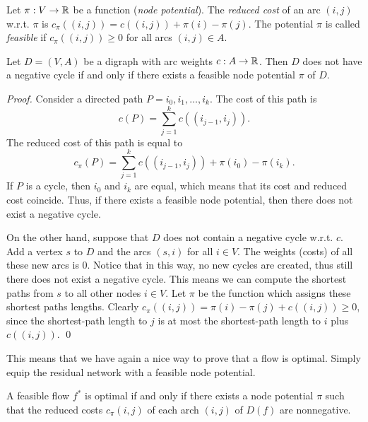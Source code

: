 Let $\pi : V  \to \mathbb{R}$ be a function (\emph{node potential}). The
\emph{reduced cost} of an arc $(i,j)$ w.r.t. $\pi$ is 
$c_\pi((i,j))=c((i,j))+\pi(i) - \pi(j)$. The potential $\pi$ is called
\emph{feasible} if $c_\pi((i,j))\geq0$ for all arcs $(i,j)\in A$. 

\begin{lemma}
  \label{lem:7}
  Let $D = (V,A)$ be a digraph with arc weights $c:A\to\mathbb{R}$. Then $D$
  does not have a negative cycle if and only if there exists a
  feasible node potential $\pi$ of $D$. 
\end{lemma}


\begin{proof}
  Consider a directed path $P = i_0,i_1,\ldots,i_k$. The cost of this
  path is 
  \begin{displaymath}
    c(P) = \sum_{j=1}^{k}c((i_{j-1},i_j)).
  \end{displaymath}
  The reduced cost of this path is equal to 
  \begin{displaymath}
    c_\pi(P) = \sum_{j=1}^{k}c((i_{j-1},i_j)) + \pi(i_0) - \pi(i_k).
  \end{displaymath}
  If $P$ is a cycle, then $i_0$ and $i_k$ are equal, which means that
  its cost and reduced cost coincide. Thus, if there exists a feasible
  node potential, then there does not exist a negative cycle. 

  
  On the other hand, suppose that $D$ does not contain a negative
  cycle w.r.t. $c$. Add a vertex $s$ to $D$ and the arcs $(s,i)$ for all 
  $i \in  V$. The weights (costs) of all these new arcs is $0$. Notice
  that in this way, no new cycles are created, thus still there does
  not exist a negative cycle. This means we can compute the shortest
  paths from $s$ to all other nodes $i \in V$. Let $\pi$ be the function
  which assigns these shortest paths lengths. Clearly $c_\pi((i,j)) =
  \pi(i) - \pi(j) + c((i,j))\geq0$, since the shortest-path length to $j$ is
  at most the shortest-path length to $i$ plus $c((i,j))$.  \qed
\end{proof}

  
This means that we have again a nice way to prove that a flow is
optimal. Simply equip  the residual network with a feasible node
potential.  



\begin{corollary}
  \label{co:1}
  A feasible flow $f^*$ is optimal if and only if there exists a node
  potential $\pi$ such that the reduced costs $c_\pi{(i,j)}$ of  each arch
  $(i,j)$ of $D(f)$ are nonnegative. 
\end{corollary}






